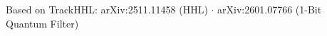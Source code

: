 \documentclass[aspectratio=169,10pt]{beamer}
\begin{document}
{
\begin{frame}[plain]
  \titlepage
  \begin{center}\footnotesize\color{gray}
  Based on TrackHHL: arXiv:2511.11458 (HHL) \;$\cdot$\; arXiv:2601.07766 (1-Bit Quantum Filter)\\[10pt]
  \logorow{0.05\textheight}
  \end{center}
\end{frame}}


\end{document}
